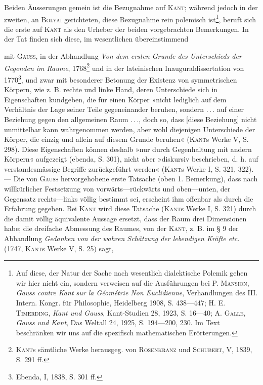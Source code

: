 Beiden Äusserungen gemein ist die Bezugnahme auf \textsc{Kant}; während jedoch
in der zweiten, an \textsc{Bolyai} gerichteten, diese Bezugnahme rein polemisch
ist\footnote{Auf diese, der Natur der Sache nach wesentlich dialektische Polemik gehen wir hier nicht ein, sondern verweisen auf die Ausführungen bei \textsc{P. Mansion}, \textit{Gauss contre Kant sur la Géométrie Non Euclidienne}, Verhandlungen des III. Intern. Kongr. für Philosophie, Heidelberg 1908, S. 438—447; \textsc{H. E. Timerding}, \textit{Kant und Gauss}, Kant-Studien 28, 1923, S. 16—40; \textsc{A. Galle}, \textit{Gauss und Kant}, Das Weltall 24, 1925, S. 194—200, 230. Im Text beschränken wir uns auf die spezifisch mathematischen Erörterungen.}, beruft sich die erste auf \textsc{Kant} als den Urheber der beiden vorgebrachten
Bemerkungen. In der Tat finden sich diese, im wesentlichen übereinstimmend
\par\clearpage{}
\noindent mit \textsc{Gauss}, in der Abhandlung \textit{Von dem ersten Grunde des Unterschieds der
Gegenden im Raume}, 1768\footnote{\textsc{Kant}s sämtliche Werke herausgeg. von \textsc{Rosenkranz} und \textsc{Schubert}, V, 1839, S. 291 ff.} und in der lateinischen Inauguraldissertation von
1770\footnote{Ebenda, I, 1838, S. 301 ff.}, und zwar mit besonderer Betonung der Existenz von symmetrischen
Körpern, wie z. B. rechte und linke Hand, deren Unterschiede sich in Eigenschaften
kundgeben, die für einen Körper »nicht lediglich auf dem Verhältnis
der Lage seiner Teile gegeneinander beruhen, sondern \mbox{.\,.\,.} auf einer Beziehung
gegen den allgemeinen Raum \mbox{.\,.\,.}, doch so, dass [diese Beziehung] nicht unmittelbar
kann wahrgenommen werden, aber wohl diejenigen Unterschiede
der Körper, die einzig und allein auf diesem Grunde beruhen« (\textsc{Kant}s Werke
V, S. 298). Diese Eigenschaften können deshalb »nur durch Gegenhaltung
mit andern Körpern« aufgezeigt (ebenda, S. 301), nicht aber »diskursiv beschrieben,
d. h. auf verstandesmässige Begriffe zurückgeführt werden« (\textsc{Kant}s
Werke I, S. 321, 322). — Die von \textsc{Gauss} hervorgehobene erste Tatsache
(oben 1. Bemerkung), dass nach willkürlicher Festsetzung von vorwärts—rückwärts
und oben—unten, der Gegensatz rechts—links völlig bestimmt sei, erscheint
ihm offenbar als durch die Erfahrung gegeben. Bei \textsc{Kant} wird diese
Tatsache (\textsc{Kant}s Werke I, S. 321) durch die damit völlig äquivalente Aussage
ersetzt, dass der Raum drei Dimensionen habe; die dreifache Abmessung
des Raumes, von der \textsc{Kant}, z. B. im § 9 der Abhandlung \textit{Gedanken von der
wahren Schätzung der lebendigen Kräfte etc.} (1747, \textsc{Kant}s Werke V, S. 25) sagt,
